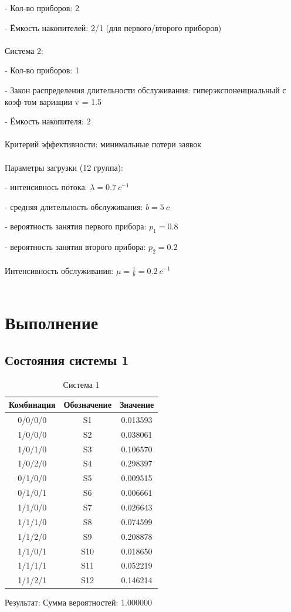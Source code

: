 \documentclass{article}
\begin{document}
- Кол-во приборов: 2

- Ёмкость накопителей: 2/1 (для первого/второго приборов)
\\ \\
Система 2: 

- Кол-во приборов: 1

- Закон распределения длительности обслуживания: гиперэкспоненциальный с коэф-том вариации v = 1.5

- Ёмкость накопителя: 2
\\ \\
Критерий эффективности: минимальные потери заявок
\\ \\
Параметры загрузки (12 группа):

- интенсивнось потока: $\lambda = 0.7 \ c^{-1}$

- средняя длительность обслуживания: $b = 5\ c$

- вероятность занятия первого прибора: $p_1 = 0.8$

- вероятность занятия второго прибора: $p_2 = 0.2$
\\ \\
Интенсивность обслуживания: $\mu = \frac{1}{b} = 0.2 \ c^{-1}$
\\ \\
\section{Выполнение}
\subsection*{Состояния системы 1}

\begin{table}[h]
    \centering
    \begin{tabular}{|c|c|c|}
    \hline
    Комбинация & Обозначение & Значение \\
    \hline
    0/0/0/0 & S1 &  0.013593\\
    1/0/0/0 & S2 &  0.038061\\
    1/0/1/0 & S3 &  0.106570\\
    1/0/2/0 & S4 &  0.298397\\
    0/1/0/0 & S5 &  0.009515\\
    0/1/0/1 & S6 &  0.006661\\
    1/1/0/0 & S7 &  0.026643\\
    1/1/1/0 & S8 &  0.074599\\
    1/1/2/0 & S9 &  0.208878\\
    1/1/0/1 & S10 &  0.018650\\
    1/1/1/1 & S11 &  0.052219\\
    1/1/2/1 & S12 &  0.146214\\
    \hline
    \end{tabular}
    \caption{Система 1}
    \label{tab:system1}
\end{table}
Результат: Сумма вероятностей: 1.000000
\end{document}
